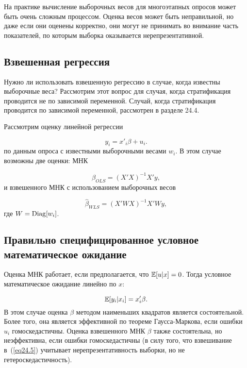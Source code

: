 На практике вычисление выборочных весов для многоэтапных опросов может быть очень сложным процессом. Оценка весов может быть неправильной, но даже если они оценены корректно, они могут не принимать во внимание часть показателей, по которым выборка оказывается нерепрезентативной. 

\subsection{Взвешенная регрессия}

Нужно ли использовать взвешенную регрессию в случае, когда известны выборочные веса? Рассмотрим этот вопрос для случая, когда стратификация проводится не по зависимой переменной. Случай, когда стратификация проводится по зависимой переменной, рассмотрен в разделе 24.4. 

Рассмотрим оценку линейной регрессии

\begin{equation}
\label{eq24.2}
y_i = x'_i\beta + u_i.
\end{equation}
по данным опроса с известными выборочными весами $w_i$. В этом случае возможны две оценки: МНК

\begin{equation}
\label{eq24.3}
\hat \beta_{OLS} = (X'X)^{-1}X'y,
\end{equation}
и взвешенного МНК с использованием выборочных весов

\begin{equation}
\label{eq24.4}
\hat \beta_{WLS} = (X'WX)^{-1}X'Wy,
\end{equation}
где $W = \mathrm{Diag}[w_i]$. 

\subsection*{Правильно специфицированное условное математическое ожидание}

Оценка МНК работает, если предполагается, что $\mathbb{E}[u|x] = 0$. Тогда условное математическое ожидание линейно по $x$:

\begin{equation}
\label{eq24.5}
\mathbb{E}[y_i|x_i] = x'_i\beta.
\end{equation}
В этом случае оценка $\beta$ методом наименьших квадратов является состоятельной. Более того, она является эффективной по теореме Гаусса-Маркова, если ошибки $u_i$ гомоскедастичны. Оценка взвешенного МНК $\beta$ также состоятельна, но неэффективна, если ошибки гомоскедастичны (в силу того, что взвешивание в~(\ref{eq24.5}) учитывает нерепрезентативность выборки, но не гетероскедастичность). 


